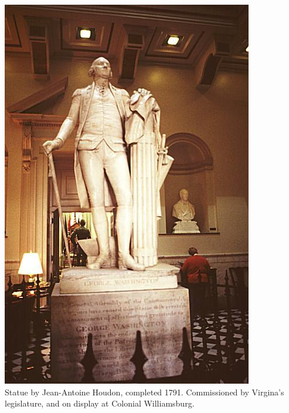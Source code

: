 \begin{frame}
    \centering
    \includegraphics[height=.8\textheight]{img/fasces/houdon-front.jpg} \\
    Statue by Jean-Antoine Houdon, completed 1791. Commissioned by Virgina's
    legislature, and on display at Colonial Williamsburg. \\
\end{frame}
